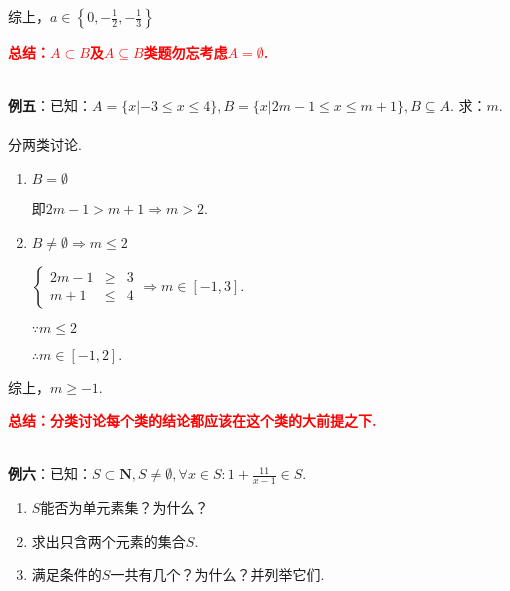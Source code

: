 \documentclass[8pt]{article}
\begin{document}
				综上，$a\in\left\{0, -\frac{1}{2}, -\frac{1}{3}\right\}$

				\textcolor{red}{\textbf{总结：$A\subset B$及$A\subseteq B$类题勿忘考虑$A=\emptyset$.}}

				~\\

				\textbf{例五}：已知：$A=\{x|-3\leq x\leq 4\}, B=\{x|2m-1\leq x\leq m+1\}, B\subseteq A.$ 求：$m$.
				~\\

				分两类讨论.

				\begin{enumerate}[label=$\arabic*^{\circ}$]

					\item $B=\emptyset$

						即$2m-1>m+1 \Rightarrow m>2$.

					\item $B\neq\emptyset \Rightarrow m\leq 2$

						$\displaystyle \left\{\begin{array}{rcl}2m-1&\geq&3\\m+1&\leq&4\end{array}\right. \Rightarrow m\in[-1,3].$

						$\because m\leq 2$

						$\therefore m\in[-1, 2].$

				\end{enumerate}

				综上，$m\geq -1$.

				\textcolor{red}{\textbf{总结：分类讨论每个类的结论都应该在这个类的大前提之下.}}

				~\\

				\textbf{例六}：已知：$S\subset \mathbf{N}, S\neq \emptyset, \forall x\in S: 1+\frac{11}{x-1}\in S.$

				\begin{enumerate}[label=$(\arabic*)$]

					\item $S$能否为单元素集？为什么？
					\item 求出只含两个元素的集合$S$.
					\item 满足条件的$S$一共有几个？为什么？并列举它们.

				\end{enumerate}
\end{document}
